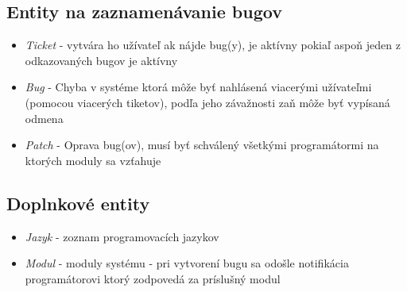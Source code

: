 \documentclass[11pt, a4paper]{article}
\begin{document}
	\subsection{Entity na zaznamenávanie bugov}
	\label{subsec:entity-na-zaznamenávanie-bugov}

	\begin{itemize}
	\item \emph{Ticket} - vytvára ho užívateľ ak nájde bug(y), je aktívny pokiaľ aspoň jeden z odkazovaných bugov je aktívny
	\item \emph{Bug} - Chyba v systéme ktorá môže byť nahlásená viacerými užívateľmi (pomocou viacerých tiketov), podľa jeho závažnosti zaň môže byť vypísaná odmena
	\item \emph{Patch} - Oprava bug(ov), musí byť schválený všetkými programátormi na ktorých moduly sa vzťahuje
	\end{itemize}

	\subsection{Doplnkové entity}
	\label{subsec:doplnkové-entity}

	\begin{itemize}
	\item \emph{Jazyk} - zoznam programovacích jazykov
	\item \emph{Modul} - moduly systému - pri vytvorení bugu sa odošle notifikácia programátorovi ktorý zodpovedá za príslušný modul
	\end{itemize}
\end{document}
